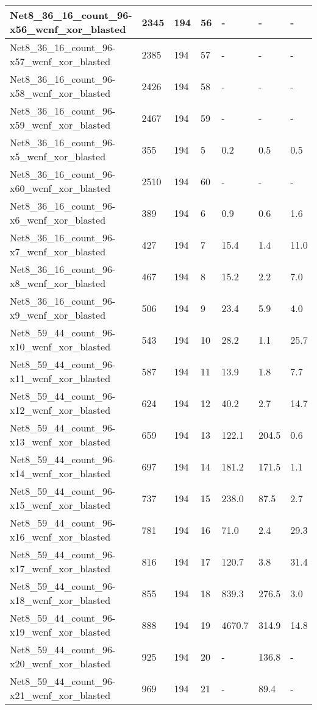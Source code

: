 \begin{scriptsize}
\begin{longtable}{|p{5cm}|l|l|l|l|l|l|}
Net8\_36\_16\_count\_96-x56\_wcnf\_xor\_blasted&2345&194&56&-&-&- \\ \hline 
Net8\_36\_16\_count\_96-x57\_wcnf\_xor\_blasted&2385&194&57&-&-&- \\ \hline 
Net8\_36\_16\_count\_96-x58\_wcnf\_xor\_blasted&2426&194&58&-&-&- \\ \hline 
Net8\_36\_16\_count\_96-x59\_wcnf\_xor\_blasted&2467&194&59&-&-&- \\ \hline 
Net8\_36\_16\_count\_96-x5\_wcnf\_xor\_blasted&355&194&5&0.2&0.5&0.5 \\ \hline 
Net8\_36\_16\_count\_96-x60\_wcnf\_xor\_blasted&2510&194&60&-&-&- \\ \hline 
Net8\_36\_16\_count\_96-x6\_wcnf\_xor\_blasted&389&194&6&0.9&0.6&1.6 \\ \hline 
Net8\_36\_16\_count\_96-x7\_wcnf\_xor\_blasted&427&194&7&15.4&1.4&11.0 \\ \hline 
Net8\_36\_16\_count\_96-x8\_wcnf\_xor\_blasted&467&194&8&15.2&2.2&7.0 \\ \hline 
Net8\_36\_16\_count\_96-x9\_wcnf\_xor\_blasted&506&194&9&23.4&5.9&4.0 \\ \hline 
Net8\_59\_44\_count\_96-x10\_wcnf\_xor\_blasted&543&194&10&28.2&1.1&25.7 \\ \hline 
Net8\_59\_44\_count\_96-x11\_wcnf\_xor\_blasted&587&194&11&13.9&1.8&7.7 \\ \hline 
Net8\_59\_44\_count\_96-x12\_wcnf\_xor\_blasted&624&194&12&40.2&2.7&14.7 \\ \hline 
Net8\_59\_44\_count\_96-x13\_wcnf\_xor\_blasted&659&194&13&122.1&204.5&0.6 \\ \hline 
Net8\_59\_44\_count\_96-x14\_wcnf\_xor\_blasted&697&194&14&181.2&171.5&1.1 \\ \hline 
Net8\_59\_44\_count\_96-x15\_wcnf\_xor\_blasted&737&194&15&238.0&87.5&2.7 \\ \hline 
Net8\_59\_44\_count\_96-x16\_wcnf\_xor\_blasted&781&194&16&71.0&2.4&29.3 \\ \hline 
Net8\_59\_44\_count\_96-x17\_wcnf\_xor\_blasted&816&194&17&120.7&3.8&31.4 \\ \hline 
Net8\_59\_44\_count\_96-x18\_wcnf\_xor\_blasted&855&194&18&839.3&276.5&3.0 \\ \hline 
Net8\_59\_44\_count\_96-x19\_wcnf\_xor\_blasted&888&194&19&4670.7&314.9&14.8 \\ \hline 
Net8\_59\_44\_count\_96-x20\_wcnf\_xor\_blasted&925&194&20&-&136.8&- \\ \hline 
Net8\_59\_44\_count\_96-x21\_wcnf\_xor\_blasted&969&194&21&-&89.4&- \\ \hline 

\end{longtable}
\end{scriptsize}
